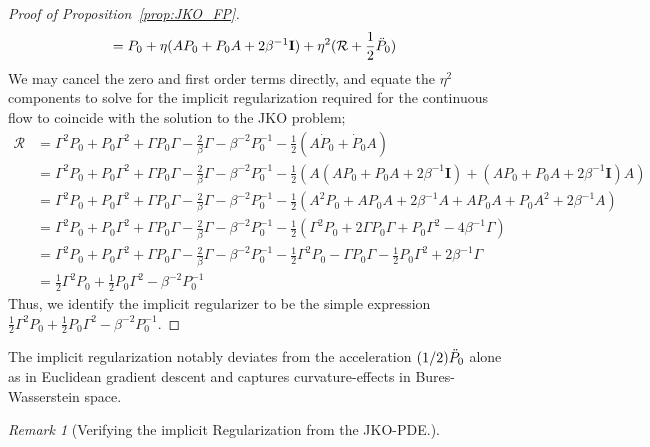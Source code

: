 \documentclass[reqno,11pt,letterpaper]{amsart}
\theoremstyle{plain}
\theoremstyle{definition}
\theoremstyle{remark}
\newtheorem{remark}{Remark}
\newcommand{\id}{\mathbf{I}}
\begin{document}
\begin{proof}[Proof of Proposition~\ref{prop:JKO_FP}]
\begin{align*}
    &= P_{0} + \eta (A P_{0} + P_{0} A + 2 \beta^{-1} \id) + \eta^{2} (\mathcal{R} + \frac{1}{2} \Ddot{P}_{0}) 
\end{align*}
We may cancel the zero and first order terms directly, and equate the $\eta^{2}$ components to solve for the implicit regularization required for the continuous flow to coincide with the solution to the JKO problem;
\begin{align*}
    \mathcal{R} &= \Gamma^{2} P_{0} +  P_{0}\Gamma^{2} + \Gamma P_{0} \Gamma - \frac{2}{\beta} \Gamma - \beta^{-2} P_{0}^{-1} - \frac{1}{2} \left( A \Dot{P}_{0} + \Dot{P}_{0} A \right) \\
    &= \Gamma^{2} P_{0} +  P_{0}\Gamma^{2} + \Gamma P_{0} \Gamma - \frac{2}{\beta} \Gamma - \beta^{-2} P_{0}^{-1} - \frac{1}{2} \left( A (A P_{0} + P_{0} A + 2 \beta^{-1} \id) + (A P_{0} + P_{0} A + 2 \beta^{-1} \id) A \right) \\
    &= \Gamma^{2} P_{0} +  P_{0}\Gamma^{2} + \Gamma P_{0} \Gamma - \frac{2}{\beta} \Gamma - \beta^{-2} P_{0}^{-1} - \frac{1}{2} \left( A^{2} P_{0} + A P_{0} A + 2 \beta^{-1} A + A P_{0} A + P_{0} A^{2} + 2 \beta^{-1} A \right) \\
    &= \Gamma^{2} P_{0} +  P_{0}\Gamma^{2} + \Gamma P_{0} \Gamma - \frac{2}{\beta} \Gamma - \beta^{-2} P_{0}^{-1} - \frac{1}{2} \left( \Gamma^{2} P_{0} + 2\Gamma P_{0} \Gamma + P_{0} \Gamma^{2} - 4 \beta^{-1} \Gamma \right) \\
    &= \Gamma^{2} P_{0} +  P_{0}\Gamma^{2} + \Gamma P_{0} \Gamma - \frac{2}{\beta} \Gamma - \beta^{-2} P_{0}^{-1}  - \frac{1}{2} \Gamma^{2} P_{0} - \Gamma P_{0} \Gamma - \frac{1}{2} P_{0} \Gamma^{2} + 2 \beta^{-1} \Gamma \\
    &= \frac{1}{2}\Gamma^{2} P_{0} +  \frac{1}{2} P_{0}\Gamma^{2} - \beta^{-2} P_{0}^{-1}
\end{align*}
Thus, we identify the implicit regularizer to be the simple expression $\frac{1}{2}\Gamma^{2} P_{0} +  \frac{1}{2} P_{0}\Gamma^{2} - \beta^{-2} P_{0}^{-1}$.
\end{proof}

The implicit regularization notably deviates from the acceleration $(1/2)\Ddot{P}_{0}$ alone as in Euclidean gradient descent \cite{barrett2021implicit} and captures curvature-effects in Bures-Wasserstein space.

\begin{remark}[Verifying the implicit Regularization from the JKO-PDE.]
\end{remark}\label{rem:BW_from_PDE}
\end{document}
